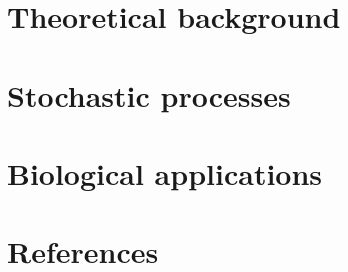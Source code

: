 

%










	\begin{frame}
		\titlepage
	\end{frame}
	
	\section{Theoretical background}	
		

	\section{Stochastic processes}			
	
	
	\section{Biological applications}
	
%	
%	
%	
%	
%	
%	
%	
	
	\section{References}
	

